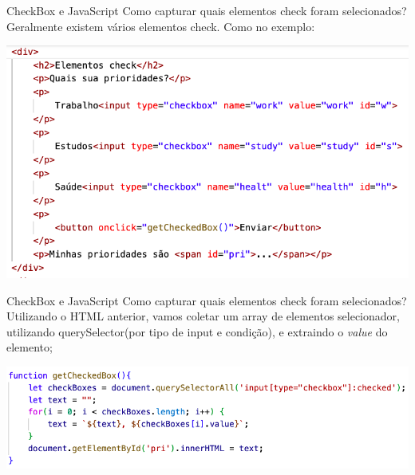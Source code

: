 \documentclass{beamer}
\begin{document}
\begin{frame}{CheckBox e JavaScript}
Como capturar quais elementos check foram selecionados?\\
Geralmente existem vários elementos check. Como no exemplo:
\begin{center}
    \includegraphics[height=0.5\paperheight]{fig/aula7/aula7_5.png}
\end{center}

\end{frame}
\begin{frame}{CheckBox e JavaScript}
Como capturar quais elementos check foram selecionados?\\
Utilizando o HTML anterior, vamos coletar um array de elementos selecionador, utilizando querySelector(por tipo de input e condição), e extraindo o \textit{value} do elemento;
\begin{center}
    \includegraphics[height=0.25\paperheight]{fig/aula7/aula7_6.png}
\end{center}

\end{frame}
\end{document}
